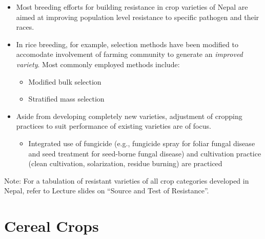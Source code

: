 \documentclass[11pt,dvipsnames,ignorenonframetext,aspectratio=169]{beamer}
\providecommand{\tightlist}{%
  \setlength{\itemsep}{0pt}\setlength{\parskip}{0pt}}
\begin{document}
\begin{frame}{}
\protect\hypertarget{section-1}{}
\small

\begin{itemize}
\tightlist
\item
  Most breeding efforts for building resistance in crop varieties of
  Nepal are aimed at improving population level resistance to specific
  pathogen and their races.
\item
  In rice breeding, for example, selection methods have been modified to
  accomodate involvement of farming community to generate an
  \emph{improved variety}. Most commonly employed methods include:

  \begin{itemize}
  \footnotesize
  \item Modified bulk selection
  \item Stratified mass selection
  \end{itemize}
\item
  Aside from developing completely new varieties, adjustment of cropping
  practices to suit performance of existing varieties are of focus.

  \begin{itemize}
  \tightlist
  \item
    Integrated use of fungicide (e.g., fungicide spray for foliar fungal
    disease and seed treatment for seed-borne fungal disease) and
    cultivation practice (clean cultivation, solarization, residue
    burning) are practiced
  \end{itemize}
\end{itemize}

\footnotesize Note: For a tabulation of resistant varieties of all crop
categories developed in Nepal, refer to Lecture slides on ``Source and
Test of Resistance''.
\end{frame}

\hypertarget{cereal-crops}{%
\section{Cereal Crops}\label{cereal-crops}}
\end{document}
